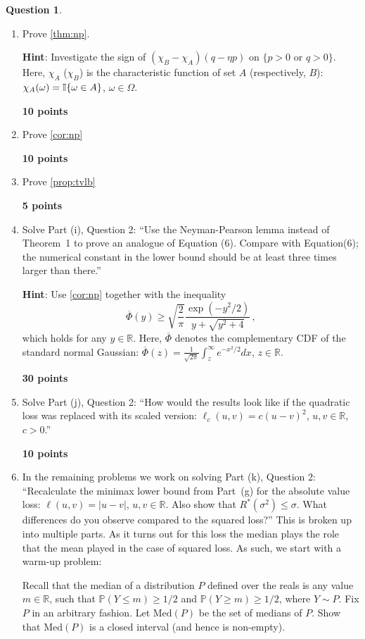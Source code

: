 \documentclass{article}
\newcommand{\R}{\mathbb{R}}
\DeclareMathOperator*{\1}{\mathbbm{1}}
\newcommand{\Prob}[1]{\mathbb{P}( #1 )}
\newcounter{DocPoints}
\newcounter{QuestionPoints}
\newcommand{\points}[1]{	\par\mbox{}\par\noindent\hfill {\bf #1 points}	\addtocounter{DocPoints}{#1}
	\addtocounter{QuestionPoints}{#1}
}
\theoremstyle{definition}
\newtheorem{question}{Question}
\theoremstyle{remark}
\newcommand{\hint}{\noindent \textbf{Hint}:\xspace}
\begin{document}
\begin{question}
\mbox{}

\begin{enumerate}[(Q1)]

\item Prove \cref{thm:np}.

\hint 
Investigate the sign of $(\chi_B - \chi_A)(q-\eta p)$ on $\{p>0 \text{ or } q>0\}$. Here, 
$\chi_A$ ($\chi_B$) is the characteristic function of set $A$ (respectively, $B$): $\chi_A(\omega) = \mathbb{I}\{\omega\in A\}$, $\omega\in \Omega$.

\points{10}

\item Prove \cref{cor:np}
\points{10}

\item Prove \cref{prop:tvlb}

\points{5}

\item Solve Part (i), Question 2: 
``Use the Neyman-Pearson lemma instead of Theorem~1 
to prove an analogue of Equation (6).
Compare with Equation(6); the numerical constant in the lower bound should be at least three times larger than there.''

\hint
Use \cref{cor:np} together with the inequality
\[
\overline\Phi(y) \ge \sqrt{\frac{2}{\pi}} \frac{\exp(-y^2/2)}{y + \sqrt{y^2+4}}\,,
\]
which holds for any $y\in \R$. 
Here,  $\overline\Phi$ denotes the complementary CDF of the standard normal Gaussian:
$\overline\Phi(z) = \frac{1}{\sqrt{2\pi}} \int_z^\infty e^{-x^2/2} dx$, $z\in \R$.
\points{30}

\item  Solve Part (j), Question 2: 
``How would the results look like if the quadratic loss was replaced with its scaled version:
$\ell_c(u,v) = c (u-v)^2$, $u,v\in \R$, $c>0$.''

\points{10}

\item  In the remaining problems we work on solving Part (k), Question 2:  ``Recalculate the minimax lower bound 
from Part~(g) for the
absolute value loss: $\ell(u,v) = |u-v|$, $u,v\in \R$.
Also show that $R^*(\sigma^2) \le \sigma$.
What differences do you observe compared to the squared loss?''
This is broken up into multiple parts. As it turns out for this loss the median plays the role that the mean played in the case of squared loss. As such, we start with a warm-up problem:

Recall that the median of a distribution $P$ defined over the reals is any value $m\in \R$, such that $\Prob{Y\le m}\ge 1/2$ and $\Prob{Y\ge m}\ge 1/2$, where $Y\sim P$.
Fix $P$ in an arbitrary fashion. Let $\text{Med}(P)$ be the set of medians of $P$. Show that $\text{Med}(P)$ is a closed interval (and hence is non-empty).


\end{enumerate}
\end{question}
\end{document}
